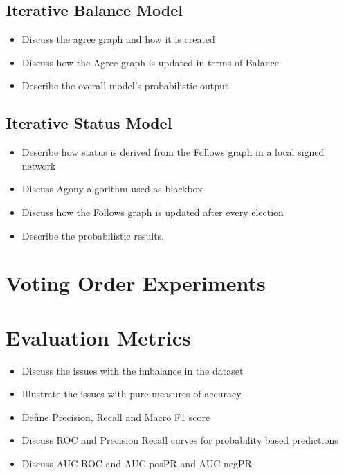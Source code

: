    \subsection{Iterative Balance Model}
        \begin{itemize}
            \item Discuss the agree graph and how it is created
            \item Discuss how the Agree graph is updated in terms of Balance
            \item Describe the overall model's probabilistic output
        \end{itemize}
    \subsection{Iterative Status Model}
        \begin{itemize} 
            \item Describe how status is derived from the Follows graph in a local signed network 
            \item Discuss Agony algorithm used as blackbox
            \item Discuss how the Follows graph is updated after every election
            \item Describe the probabilistic results.
        \end{itemize}

\section{Voting Order Experiments}
\label{sec:voting-order}


\section{Evaluation Metrics}
\label{sec:eval-metrics}
\begin{itemize}
    \item Discuss the issues with the imbalance in the dataset
    \item Illustrate the issues with pure measures of accuracy
    \item Define Precision, Recall and Macro F1 score
    \item Discuss ROC and Precision Recall curves for probability based predictions 
    \item Discuss AUC ROC and AUC posPR and AUC negPR
\end{itemize}